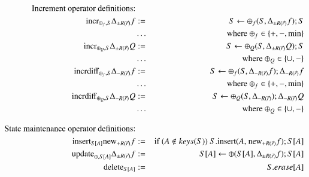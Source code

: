\documentclass{article}
\begin{document}
%
%
\begin{figure*}
\begin{eqnarray}
\mbox{Increment operator definitions:} && \nonumber\\
\label{eq:incr1}
\algincr_{\oplus_f, S} \Delta_{\pm R(\vec{r})} f &:=& S \leftarrow
\oplus_f(S, \Delta_{\pm R(\vec{r})} f); S
\\
\nonumber &\dots& \mbox{where $\oplus_f \in \{+,-,\min\}$}
\\
\label{eq:incr2}
\algincr_{\oplus_Q, S} \Delta_{\pm R(\vec{r})} Q &:=& S \leftarrow
\oplus_Q(S, \Delta_{\pm R(\vec{r})} Q); S
\\
\nonumber &\dots& \mbox{where $\oplus_Q \in \{\cup, -\}$}
\\
%
%
\label{eq:incr3}
\algincrdiff_{\oplus_f, S} \Delta_{-R(\vec{r})} f &:=&
S \leftarrow \oplus_f(S, \Delta_{-R(\vec{r})} f); \Delta_{-R(\vec{r})} f
\\
\nonumber &\dots& \mbox{where $\oplus_f \in \{+, -,\min\}$}
\\
\label{eq:incr4}
\algincrdiff_{\oplus_Q, S} \Delta_{-R(\vec{r})} Q &:=&
S \leftarrow \oplus_Q(S, \Delta_{-R(\vec{r})}); \Delta_{-R(\vec{r})} Q
\\
\nonumber &\dots& \mbox{where $\oplus_Q \in \{\cup, -\}$}
%
%
\\[2ex]
\mbox{State maintenance operator definitions:} && \nonumber
\\
\label{eq:sm1}
\alginsert_{S[A]} \algnew_{+R(\vec{r})} f
&:=&
\mbox{if ($A \notin keys(S)$) $S$.insert($A$,  $\algnew_{+R(\vec{r})} f$)};
S[A]
\\
\label{eq:sm2}
\algupdate_{\oplus, S[A]} \Delta_{\pm R(\vec{r})} f
&:=&
S[A] \leftarrow \oplus(S[A], \Delta_{\pm R(\vec{r})} f);
S[A]
\\
\label{eq:sm3}
\algdelete_{S[A]}
&:=&
S.erase[A]
\end{eqnarray}
\end{figure*}
\end{document}
